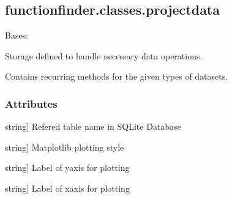 \documentclass[letterpaper,10pt,english]{sphinxmanual}
\begin{document}
\sphinxstepscope


\subsection{functionfinder.classes.projectdata}
\label{\detokenize{_autosummary/functionfinder.classes.projectdata:functionfinder-classes-projectdata}}\label{\detokenize{_autosummary/functionfinder.classes.projectdata::doc}}

\begin{fulllineitems}
\label{\detokenize{_autosummary/functionfinder.classes.projectdata:functionfinder.classes.projectdata}}
\pysigstartsignatures
{}
\pysigstopsignatures
\sphinxAtStartPar
Bases: 

\sphinxAtStartPar
Storage defined to handle necessary data operations.

\sphinxAtStartPar
Contains recurring methods for the given types of datasets.


\subsubsection{Attributes}
\label{\detokenize{_autosummary/functionfinder.classes.projectdata:attributes}}\begin{description}
\sphinxlineitem{\_table}{[}string{]}
\sphinxAtStartPar
Refered table name in SQLite Database

\sphinxlineitem{\_style}{[}string{]}
\sphinxAtStartPar
Matplotlib plotting style

\sphinxlineitem{ylabel}{[}string{]}
\sphinxAtStartPar
Label of y\sphinxhyphen{}axis for plotting

\sphinxlineitem{xlabel}{[}string{]}
\sphinxAtStartPar
Label of x\sphinxhyphen{}axis for plotting


\end{description}
\end{fulllineitems}
\end{document}
